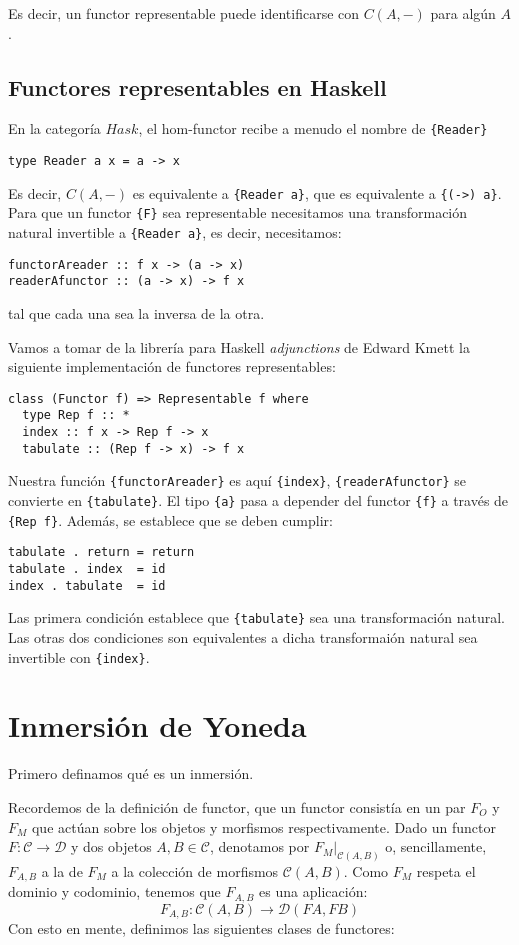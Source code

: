\documentclass[12pt, twoside]{book}
\newcommand{\code}[1]{\Verb+{#1}+}
\newcommand{\cat}{{\mathcal{C}}}
\newcommand{\Hask}{{Hask}}
\begin{document}
Es decir, un functor representable puede identificarse con $C(A,-)$ para algún $A$.

\subsection{Functores representables en Haskell}
En la categoría $\Hask$, el hom-functor recibe a menudo el nombre de \code{Reader}
\begin{verbatim}
type Reader a x = a -> x
\end{verbatim}
Es decir, $C(A,-)$ es equivalente a \code{Reader a}, que es equivalente a \code{(->) a}.
Para que un functor \code{F} sea representable necesitamos una transformación natural invertible a \code{Reader a}, es decir, necesitamos:
\begin{verbatim}
functorAreader :: f x -> (a -> x)
readerAfunctor :: (a -> x) -> f x
\end{verbatim}
tal que cada una sea la inversa de la otra.

Vamos a tomar de la librería para Haskell \textit{adjunctions} de Edward Kmett la siguiente implementación de functores representables:
\begin{verbatim}
class (Functor f) => Representable f where
  type Rep f :: *
  index :: f x -> Rep f -> x
  tabulate :: (Rep f -> x) -> f x
\end{verbatim}
Nuestra función \code{functorAreader} es aquí \code{index}, \code{readerAfunctor} se convierte en \code{tabulate}.
El tipo \code{a} pasa a depender del functor \code{f} a través de \code{Rep f}.
Además, se establece que se deben cumplir:
\begin{verbatim}
tabulate . return = return
tabulate . index  = id
index . tabulate  = id
\end{verbatim}
Las primera condición establece que \code{tabulate} sea una transformación natural. 
Las otras dos condiciones son equivalentes a dicha transformaión natural sea invertible con \code{index}.

\section{Inmersión de Yoneda}
Primero definamos qué es un inmersión.

Recordemos de la definición de functor, que un functor consistía en un par $F_O$ y $F_M$ que actúan sobre los objetos y morfismos respectivamente.
Dado un functor $F \colon \cat \to \mathcal{D}$ y dos objetos $A, B \in \cat$, denotamos por $F_M|_{\cat(A,B)}$ o, sencillamente, $F_{A,B}$ a la  de $F_M$ a la colección de morfismos $\cat(A,B)$.
Como $F_M$ respeta el dominio y codominio, tenemos que $F_{A,B}$ es una aplicación:
\[ F_{A,B} \colon \cat(A,B) \to \mathcal{D}(F A, F B) \]
Con esto en mente, definimos las siguientes clases de functores:
\end{document}
